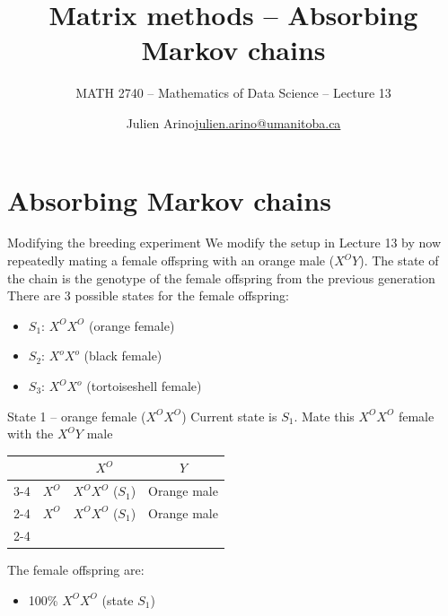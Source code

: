 \documentclass[aspectratio=169]{beamer}\usepackage[]{graphicx}\usepackage[]{xcolor}
\subtitle{MATH 2740 -- Mathematics of Data Science -- Lecture 13}
\author{\texorpdfstring{Julien Arino\newline\url{julien.arino@umanitoba.ca}}{Julien Arino}}
\institute{Department of Mathematics @ University of Manitoba}
\title{Matrix methods -- Absorbing Markov chains}
\begin{document}


\section{Absorbing Markov chains}

\begin{frame}{Modifying the breeding experiment}
    We modify the setup in Lecture 13 by now repeatedly mating a female offspring with an orange male ($X^O Y$).
    \vfill
    The state of the chain is the genotype of the female offspring from the previous generation
    \vfill
    There are 3 possible states for the female offspring:
    \begin{itemize}
        \item $S_1$: $X^O X^O$ (orange female)
        \item $S_2$: $X^o X^o$ (black female)
        \item $S_3$: $X^O X^o$ (tortoiseshell female)
    \end{itemize}
\end{frame}

\begin{frame}{State 1 -- orange female ($X^O X^O$)}
    Current state is $S_1$. Mate this $X^O X^O$ female with the $X^O Y$ male
    \vfill
    \begin{center}
          \renewcommand{\arraystretch}{1.5}
      \begin{tabular}{c c | c | c |}
      \multicolumn{2}{c}{} & \multicolumn{1}{c}{$X^O$} & \multicolumn{1}{c}{$Y$} \\ \cline{3-4}
      \multirow{2}{*}{\rotatebox{90}{Mother}} & $X^O$ & \cellcolor{punnettorange}$X^O X^O$ ($S_1$) & \cellcolor{punnettorange}Orange male \\ \cline{2-4}
      & $X^O$ & \cellcolor{punnettorange}$X^O X^O$ ($S_1$) & \cellcolor{punnettorange}Orange male \\ \cline{2-4}
      \end{tabular}
    \end{center}

    \vfill
    The female offspring are:
    \begin{itemize}
        \item 100\% $X^O X^O$ (state $S_1$)
    \end{itemize}
\end{frame}
\end{document}
